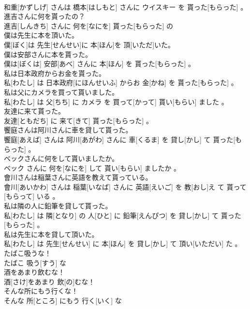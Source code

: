 \documentclass[8pt]{extreport}
\begin{document}
\begin{CJK}{UTF8}{min}
\\	和重[かずしげ] さんは 橋本[はしもと] さんに ウイスキー を 貰った[もらった] 。
\\	進吉さんに何を貰ったの？	
\\	進吉[しんきち] さんに 何を[なにを] 貰った[もらった] の 
\\	僕は先生に本を頂いた。	
\\	僕[ぼく]は 先生[せんせい]に 本[ほん]を 頂[いただ]いた。
\\	僕は安部さんに本を貰った。	
\\	僕は[ぼくは] 安部[あべ] さんに 本[ほん] を 貰った[もらった] 。
\\	私は日本政府からお金を貰った。	
\\	私[わたし] は 日本政府[にほんせいふ] からお 金[かね] を 貰った[もらった] 。
\\	私は父にカメラを買って貰いました。	
\\	私[わたし] は 父[ちち] に カメラ を 買って[かって] 貰い[もらい] ました 。
\\	友達に来て貰った。	
\\	友達[ともだち] に 来て[きて] 貰った[もらった] 。
\\	饗庭さんは阿川さんに車を貸して貰った。	
\\	饗庭[あえば] さんは 阿川[あがわ] さんに 車[くるま] を 貸し[かし] て 貰った[もらった] 。
\\	ベックさんに何をして貰いましたか。	
\\	ベック さんに 何を[なにを] して 貰い[もらい] ましたか 。
\\	會川さんは稲葉さんに英語を教えて貰っている。	
\\	會川[あいかわ] さんは 稲葉[いなば] さんに 英語[えいご] を 教[おし]え て 貰って[もらって] いる 。
\\	私は隣の人に鉛筆を貸して貰った。	
\\	私[わたし] は 隣[となり] の 人[ひと] に 鉛筆[えんぴつ] を 貸し[かし] て 貰った[もらった] 。
\\	私は先生に本を貸して頂いた。	
\\	私[わたし] は 先生[せんせい] に 本[ほん] を 貸し[かし] て 頂い[いただい] た 。
\\	たばこ吸うな！	
\\	たばこ 吸う[すう] な 
\\	酒をあまり飲むな！	
\\	酒[さけ]をあまり 飲[の]むな！
\\	そんな所にもう行くな！	
\\	そんな 所[ところ] にもう 行く[いく] な 

\end{CJK}
\end{document}
